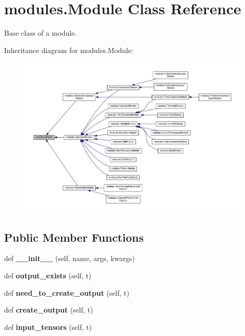 \hypertarget{classmodules_1_1_module}{}\section{modules.\+Module Class Reference}
\label{classmodules_1_1_module}


Base class of a module.  




Inheritance diagram for modules.\+Module\+:\nopagebreak
\begin{figure}[H]
\begin{center}
\leavevmode
\includegraphics[width=350pt]{classmodules_1_1_module__inherit__graph}
\end{center}
\end{figure}
\subsection*{Public Member Functions}
\begin{DoxyCompactItemize}
\item 
\mbox{\label{classmodules_1_1_module_a7811295ea0ad2c9fefd2b205aad7fa29}} 
def {\bfseries \+\_\+\+\_\+init\+\_\+\+\_\+} (self, name, args, kwargs)
\item 
\mbox{\label{classmodules_1_1_module_a9a4b685e73bdcaa68764633e93a11935}} 
def {\bfseries output\+\_\+exists} (self, t)
\item 
\mbox{\label{classmodules_1_1_module_a5200523b4f6bdc74e06059599546a2a3}} 
def {\bfseries need\+\_\+to\+\_\+create\+\_\+output} (self, t)
\item 
\mbox{\label{classmodules_1_1_module_ad0a7fdcec077c92e3f3fdf785ffeea34}} 
def {\bfseries create\+\_\+output} (self, t)
\item 
\mbox{\label{classmodules_1_1_module_a43c6b4fc93a1d339b96fa78f39ab583e}} 
def {\bfseries input\+\_\+tensors} (self, t)
\end{DoxyCompactItemize}
